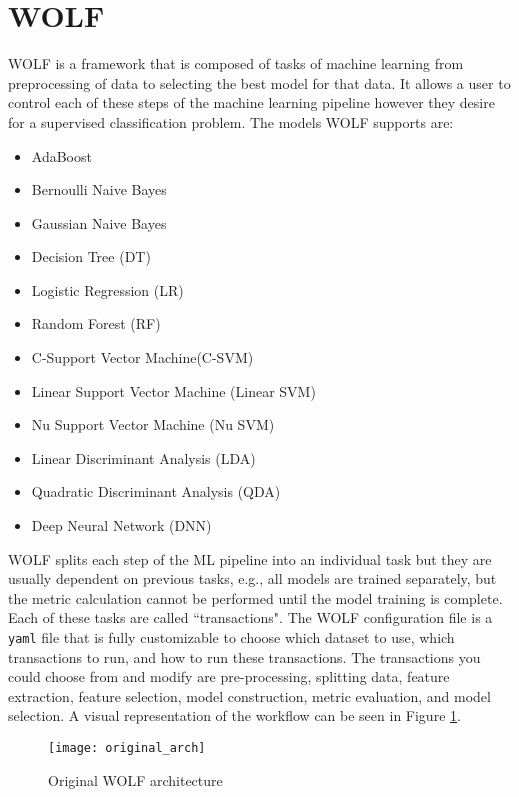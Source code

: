 \section*{WOLF}
WOLF is a framework that is composed of tasks of machine learning from preprocessing of data to selecting the best model for that data. It allows a user to control each of these steps of the machine learning pipeline however they desire for a supervised classification problem. The models WOLF supports are:
\begin{itemize}
\item AdaBoost
\item Bernoulli Naive Bayes
\item Gaussian Naive Bayes
\item Decision Tree (DT)
\item Logistic Regression (LR)
\item Random Forest (RF)
\item C-Support Vector Machine(C-SVM)
\item Linear Support Vector Machine (Linear SVM)
\item Nu Support Vector Machine (Nu SVM)
\item Linear Discriminant Analysis (LDA)
\item Quadratic Discriminant Analysis (QDA)
\item Deep Neural Network (DNN)
\end{itemize}

WOLF splits each step of the ML pipeline into an individual task but they are usually dependent on previous tasks, e.g., all models are trained separately, but the metric calculation cannot be performed until the model training is complete. Each of these tasks are called ``transactions". The WOLF configuration file is a {\tt yaml} file that is fully customizable to choose which dataset to use, which transactions to run, and how to run these transactions. The transactions you could choose from and modify are pre-processing, splitting data, feature extraction, feature selection, model construction, metric evaluation, and model selection. A visual representation of the workflow can be seen in Figure \ref{fig:original WOLF workflow}.

\begin{figure}[H]
	\centering
	\texttt{[image: original\_arch]}
	\caption{Original WOLF architecture \parencite{WOLFprojectreport}}
	\label{fig:original WOLF workflow}
\end{figure}

